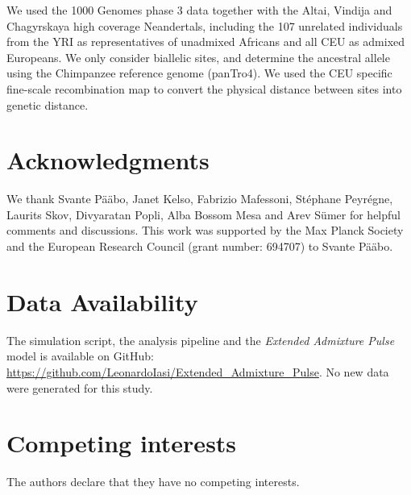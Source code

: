 \documentclass[11pt]{article}
\begin{document}
We used the 1000 Genomes phase 3 data together with the Altai, Vindija and Chagyrskaya high coverage Neandertals, including the 107 unrelated individuals from the YRI as representatives of unadmixed Africans and all CEU as admixed Europeans. We only consider biallelic sites, and determine the ancestral allele using  the Chimpanzee reference genome (panTro4). We used the CEU specific fine-scale recombination map \citep{spence_inference_2019} to convert the physical distance between sites into genetic distance. 


\section{Acknowledgments}

We thank Svante P\"a\"abo, Janet Kelso, Fabrizio Mafessoni, St\'{e}phane Peyr\'{e}gne, Laurits Skov, Divyaratan Popli, Alba Bossom Mesa and Arev S\"umer for helpful comments and discussions.
This work was supported by the Max Planck Society and the European Research Council (grant number: 694707) to Svante P\"a\"abo.

\section{Data Availability}\label{Data Availability}

The simulation script, the analysis pipeline and the \emph{Extended Admixture Pulse} model is  available  on  GitHub: \url{https://github.com/LeonardoIasi/Extended_Admixture_Pulse}. No new data were generated for this study.

\section{Competing interests}

The authors declare that they have no competing interests.

\hypertarget{refs}{}




\end{document}
